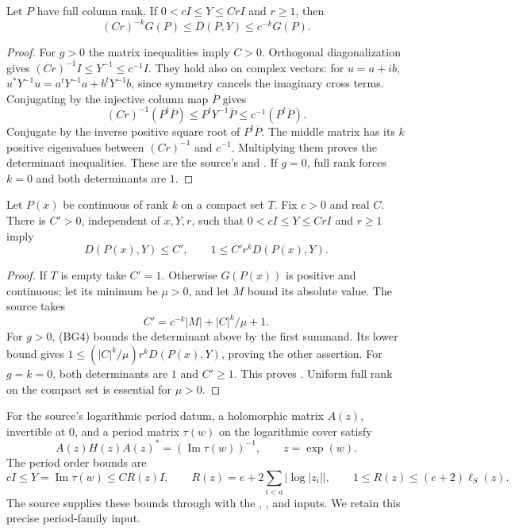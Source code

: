 \begin{srlemma}
\label{lem:faithful-subframe-determinant-comparison}
Let \(P\) have full column rank. If \(0<cI\le Y\le CrI\)
and \(r\ge1\), then
\[
              (Cr)^{-k}G(P)\le D(P,Y)\le c^{-k}G(P).
 \tag{BG4}\label{eq:faithful-subframe-det-bounds}
\]
\end{srlemma}
\begin{proof}
For \(g>0\) the matrix inequalities imply \(C>0\).
Orthogonal diagonalization gives
\((Cr)^{-1}I\le Y^{-1}\le c^{-1}I\).
They hold also on complex vectors: for \(u=a+ib\),
\(u^*Y^{-1}u=a^tY^{-1}a+b^tY^{-1}b\), since symmetry
cancels the imaginary cross terms.
Conjugating by the injective column map \(\overline P\) gives
\[
 (Cr)^{-1}(P^t\overline P)
 \le P^tY^{-1}\overline P\le c^{-1}(P^t\overline P).
\]
Conjugate by the inverse positive square root of
\(P^t\overline P\). The middle matrix has its \(k\) positive
eigenvalues between \((Cr)^{-1}\) and \(c^{-1}\).
Multiplying them proves the determinant inequalities.
These are the source's
 and .
If \(g=0\), full rank forces \(k=0\) and both determinants are \(1\).
\end{proof}

\begin{srproposition}
\label{prop:faithful-compact-subframe-log}
Let \(P(x)\) be continuous of rank \(k\) on a compact set \(T\).
Fix \(c>0\) and real \(C\).
There is \(C'>0\), independent of \(x,Y,r\), such that
\(0<cI\le Y\le CrI\) and \(r\ge1\) imply
\[
                 D(P(x),Y)\le C',\qquad
                    1\le C'r^kD(P(x),Y).
 \tag{BG5}\label{eq:faithful-compact-subframe-log}
\]
\end{srproposition}
\begin{proof}
If \(T\) is empty take \(C'=1\).
Otherwise \(G(P(x))\) is positive and continuous; let its
minimum be \(\mu>0\), and let \(M\) bound its absolute value.
The source takes
\[
                        C'=c^{-k}|M|+|C|^k/\mu+1.
 \tag{BG6}\label{eq:faithful-subframe-constant}
\]
For \(g>0\), (BG4) bounds the determinant above by the first
summand. Its lower bound gives
\(1\le(|C|^k/\mu)r^kD(P(x),Y)\), proving the other assertion.
For \(g=k=0\), both determinants are \(1\) and \(C'\ge1\).
This proves .
Uniform full rank on the compact set is essential for \(\mu>0\).
\end{proof}

For the source's logarithmic period datum, a holomorphic matrix
\(A(z)\), invertible at \(0\), and a period matrix \(\tau(w)\)
on the logarithmic cover satisfy
\[
 A(z)H(z)A(z)^*=(\operatorname{Im}\tau(w))^{-1},
                         \qquad z=\exp(w).
 \tag{BG7}\label{eq:faithful-period-trivialization}
\]
The period order bounds are
\[
 cI\le Y=\operatorname{Im}\tau(w)\le C R(z)I,\qquad
 R(z)=e+2\sum_{i<a}|\log|z_i||,\qquad
       1\le R(z)\le(e+2)\ell_S(z).
 \tag{BG8}\label{eq:faithful-chart-radius}
\]
The source supplies these bounds through 
with the ,
, and  inputs.
We retain this precise period-family input.

